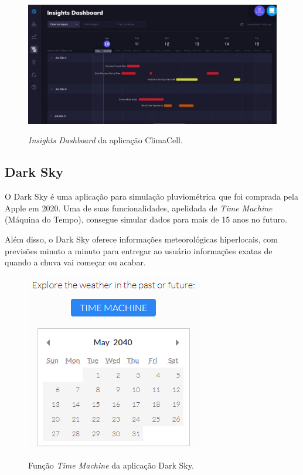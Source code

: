 \begin{figure}[H]
	\caption{\small \emph{Insights Dashboard} da aplicação ClimaCell.}
	\centering
	\includegraphics[width=\textwidth]{figs/climacell.jpg}
	\label{f.darksky-calendar}
\end{figure}

\subsection{Dark Sky}
\label{ss.darksky}
O Dark Sky é uma aplicação para simulação pluviométrica que foi comprada pela Apple em 2020. Uma de suas funcionalidades, apelidada de \emph{Time Machine} (Máquina do Tempo), consegue simular dados para mais de 15 anos no futuro.

Além disso, o Dark Sky oferece informações meteorológicas hiperlocais, com previsões minuto a minuto para entregar ao usuário informações exatas de quando a chuva vai começar ou acabar.

\begin{figure}[H]
	\caption{\small Função \emph{Time Machine} da aplicação Dark Sky.}
	\centering
	\includegraphics[scale=0.75]{figs/darkskyCalendar.PNG}
	\label{f.darksky-calendar}
\end{figure}

